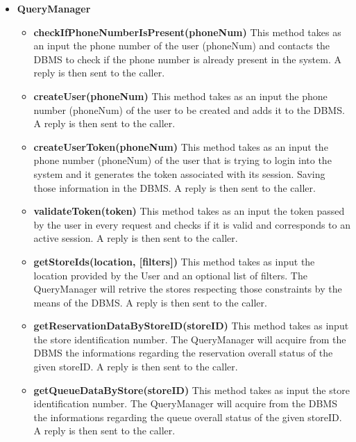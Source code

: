 \begin{itemize}
    \item \textbf{QueryManager}
    \begin{itemize}
        \item \textbf{checkIfPhoneNumberIsPresent(phoneNum)}
        This method takes as an input the phone number of the user (phoneNum) and contacts the DBMS to check if the phone number is already present in the system. A reply is then sent to the caller.

        \item \textbf{createUser(phoneNum)}
        This method takes as an input the phone number (phoneNum) of the user to be created and adds it to the DBMS. A reply is then sent to the caller.

        \item \textbf{createUserToken(phoneNum)}
        This method takes as an input the phone number (phoneNum) of the user that is trying to login into the system and it generates the token associated with its session. Saving those information in the DBMS. A reply is then sent to the caller.

        \item \textbf{validateToken(token)}
        This method takes as an input the token passed by the user in every request and checks if it is valid and corresponds to an active session. A reply is then sent to the caller.

        \item \textbf{getStoreIds(location, [filters])}
        This method takes as input the location provided by the User and an optional list of filters. 
        The QueryManager will retrive the stores respecting those constraints by the means of the DBMS. A reply is then sent to the caller. 

        \item \textbf{getReservationDataByStoreID(storeID)}
        This method takes as input the store identification number. The QueryManager will acquire from the DBMS the informations regarding the reservation overall status of the given storeID. A reply is then sent to the caller.

        \item \textbf{getQueueDataByStore(storeID)}
        This method takes as input the store identification number. The QueryManager will acquire from the DBMS the informations regarding the queue overall status of the given storeID. A reply is then sent to the caller. 


\end{itemize}
\end{itemize}

